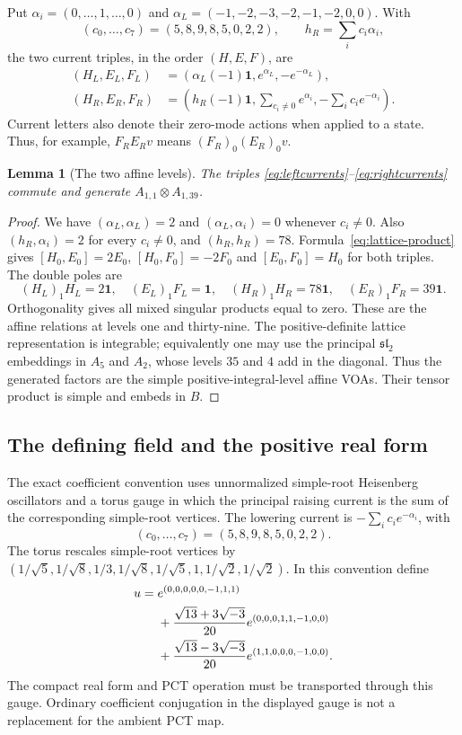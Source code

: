 \documentclass[11pt,a4paper]{article}
\newtheorem{lemma}[theorem]{Lemma}
\theoremstyle{definition}
\newcommand{\one}{\mathbf1}
\begin{document}
Put $\alpha_i=(0,\ldots,1,\ldots,0)$ and
$\alpha_L=(-1,-2,-3,-2,-1,-2,0,0)$. With
\[
 (c_0,\ldots,c_7)=(5,8,9,8,5,0,2,2),\qquad
 h_R=\sum_i c_i\alpha_i,
\]
the two current triples, in the order $(H,E,F)$, are
\begin{align}
 (H_L,E_L,F_L)&=
   (\alpha_L(-1)\one,e^{\alpha_L},-e^{-\alpha_L}),\label{eq:leftcurrents}\\
 (H_R,E_R,F_R)&=
   \left(h_R(-1)\one,\sum_{c_i\ne0}e^{\alpha_i},
                    -\sum_i c_i e^{-\alpha_i}\right).
                    \label{eq:rightcurrents}
\end{align}
Current letters also denote their zero-mode actions when applied to
a state. Thus, for example, $F_RE_Rv$ means
$(F_R)_0(E_R)_0v$.

\begin{lemma}[The two affine levels]\label{lem:levels}
The triples \eqref{eq:leftcurrents}--\eqref{eq:rightcurrents} commute
and generate $A_{1,1}\otimes A_{1,39}$.
\end{lemma}
\begin{proof}
We have $(\alpha_L,\alpha_L)=2$ and
$(\alpha_L,\alpha_i)=0$ whenever $c_i\ne0$.
Also $(h_R,\alpha_i)=2$ for every $c_i\ne0$, and
$(h_R,h_R)=78$. Formula~\eqref{eq:lattice-product} gives
$[H_0,E_0]=2E_0$, $[H_0,F_0]=-2F_0$ and $[E_0,F_0]=H_0$
for both triples. The double poles are
\[
 (H_L)_1H_L=2\one,\quad (E_L)_1F_L=\one,\quad
 (H_R)_1H_R=78\one,\quad (E_R)_1F_R=39\one.
\]
Orthogonality gives all mixed singular products equal to zero.
These are the affine relations at levels one and thirty-nine.
The positive-definite lattice representation is integrable; equivalently
one may use the principal $\mathfrak{sl}_2$ embeddings in $A_5$ and
$A_2$, whose levels $35$ and $4$ add in the diagonal. Thus the
generated factors are the simple positive-integral-level affine VOAs.
Their tensor product is simple and embeds in $B$.
\end{proof}

\subsection{The defining field and the positive real form}
The exact coefficient convention uses unnormalized simple-root
Heisenberg oscillators and a torus gauge in which the principal raising
current is the sum of the corresponding simple-root vertices. The
lowering current is \(-\sum_i c_i e^{-\alpha_i}\), with
\[
 (c_0,\ldots,c_7)=(5,8,9,8,5,0,2,2).
\]
The torus rescales simple-root vertices by
\( (1/\sqrt5,1/\sqrt8,1/3,1/\sqrt8,1/\sqrt5,1,1/\sqrt2,1/\sqrt2)\).
In this convention define
\begin{align}
 u={}&e^{(0,0,0,0,0,-1,1,1)}\notag\\
 &+\frac{\sqrt{13}+3\sqrt{-3}}{20}
                   e^{(0,0,0,1,1,-1,0,0)}\notag\\
 &+\frac{\sqrt{13}-3\sqrt{-3}}{20}
                   e^{(1,1,0,0,0,-1,0,0)}.\label{eq:u}
\end{align}
The compact real form and PCT operation must be transported through
this gauge. Ordinary coefficient conjugation in the displayed gauge
is not a replacement for the ambient PCT map.
\end{document}
